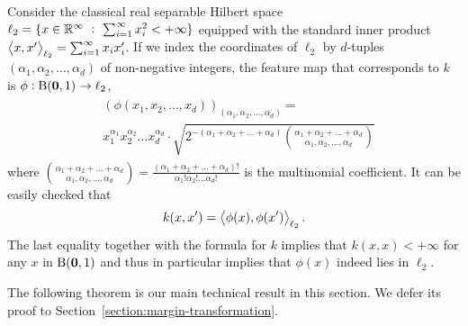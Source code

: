 Consider the classical real separable Hilbert space $\ell_2 = \{ x \in \mathbb{R}^\infty
~:~ \sum_{i=1}^\infty x_i^2 < + \infty \}$ equipped with the standard inner
product $\left\langle x, x' \right\rangle_{\ell_2} = \sum_{i=1}^\infty x_i x'_i$. If we index the
coordinates of $\ell_2$ by $d$-tuples $(\alpha_1, \alpha_2, \dots, \alpha_d)$ of
non-negative integers, the feature map that corresponds to $k$ is $\phi: \operatorname{B}(\mathbf{0},1)
\to \ell_2$,
\begin{align}
\begin{split}
&\left(\phi(x_1, x_2, \dots, x_d)\right)_{(\alpha_1, \alpha_2, \dots, \alpha_d)} = \\
& x_1^{\alpha_1} x_2^{\alpha_2} \dots x_d^{\alpha_d} \cdot \sqrt{2^{-(\alpha_1 + \alpha_2 + \dots + \alpha_d)} \binom{\alpha_1 + \alpha_2 + \dots + \alpha_d}{\alpha_1, \alpha_2, \dots, \alpha_d}}
\end{split}
\label{equation:phi}
\end{align}
where $\binom{\alpha_1 + \alpha_2 + \dots + \alpha_d}{\alpha_1, \alpha_2, \dots,
\alpha_d} = \frac{(\alpha_1 + \alpha_2 + \dots + \alpha_d)!}{\alpha_1! \alpha_2!
\dots \alpha_d!}$ is the multinomial coefficient. It can be easily checked that
$$
k(x,x') = \left\langle \phi(x), \phi(x') \right\rangle_{\ell_2}.
$$
The last equality together with the formula for $k$ implies that $k(x,x) <
+\infty$ for any $x$ in $\operatorname{B}(\mathbf{0},1)$ and thus in particular implies that $\phi(x)$
indeed lies in $\ell_2$.

The following theorem is our main technical result in this section. We defer its
proof to Section~\ref{section:margin-transformation}.

